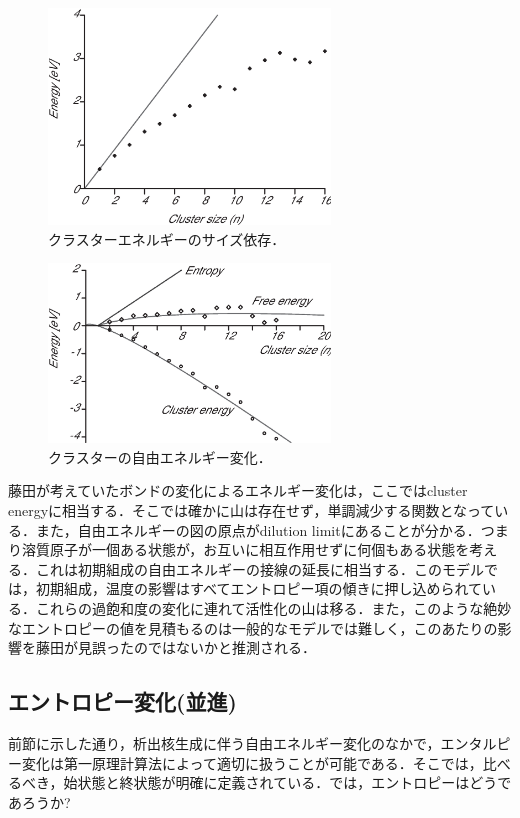 \documentclass[a4j,10pt]{jarticle}
\begin{document}
\begin{figure}\begin{center}
\includegraphics[width=75mm]{./figs/ClusterEnergy.eps}
\caption{クラスターエネルギーのサイズ依存．}
\label{ClusterEnergy}
\end{center}\end{figure}
\begin{figure}\begin{center}
\includegraphics[width=75mm]{./figs/ClusterFreeEnergy.eps}
\caption{クラスターの自由エネルギー変化．}
\label{ClusterFreeEnergy}
\end{center}\end{figure}

藤田が考えていたボンドの変化によるエネルギー変化は，ここではcluster energyに相当する．そこでは確かに山は存在せず，単調減少する関数となっている．また，自由エネルギーの図の原点がdilution limitにあることが分かる．つまり溶質原子が一個ある状態が，お互いに相互作用せずに何個もある状態を考える．これは初期組成の自由エネルギーの接線の延長に相当する．このモデルでは，初期組成，温度の影響はすべてエントロピー項の傾きに押し込められている．これらの過飽和度の変化に連れて活性化の山は移る．また，このような絶妙なエントロピーの値を見積もるのは一般的なモデルでは難しく，このあたりの影響を藤田が見誤ったのではないかと推測される．
\subsection{エントロピー変化(並進)}
前節に示した通り，析出核生成に伴う自由エネルギー変化のなかで，エンタルピー変化は第一原理計算法によって適切に扱うことが可能である．そこでは，比べるべき，始状態と終状態が明確に定義されている．では，エントロピーはどうであろうか?
\end{document}
